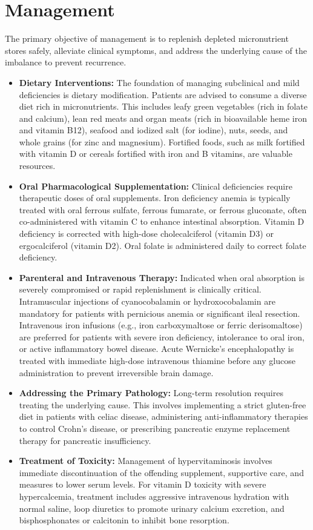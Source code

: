 \section*{Management}
The primary objective of management is to replenish depleted micronutrient stores safely, alleviate clinical symptoms, and address the underlying cause of the imbalance to prevent recurrence.

\begin{itemize}
    \item \textbf{Dietary Interventions:} The foundation of managing subclinical and mild deficiencies is dietary modification. Patients are advised to consume a diverse diet rich in micronutrients. This includes leafy green vegetables (rich in folate and calcium), lean red meats and organ meats (rich in bioavailable heme iron and vitamin B12), seafood and iodized salt (for iodine), nuts, seeds, and whole grains (for zinc and magnesium). Fortified foods, such as milk fortified with vitamin D or cereals fortified with iron and B vitamins, are valuable resources.
    \item \textbf{Oral Pharmacological Supplementation:} Clinical deficiencies require therapeutic doses of oral supplements. Iron deficiency anemia is typically treated with oral ferrous sulfate, ferrous fumarate, or ferrous gluconate, often co-administered with vitamin C to enhance intestinal absorption. Vitamin D deficiency is corrected with high-dose cholecalciferol (vitamin D3) or ergocalciferol (vitamin D2). Oral folate is administered daily to correct folate deficiency.
    \item \textbf{Parenteral and Intravenous Therapy:} Indicated when oral absorption is severely compromised or rapid replenishment is clinically critical. Intramuscular injections of cyanocobalamin or hydroxocobalamin are mandatory for patients with pernicious anemia or significant ileal resection. Intravenous iron infusions (e.g., iron carboxymaltose or ferric derisomaltose) are preferred for patients with severe iron deficiency, intolerance to oral iron, or active inflammatory bowel disease. Acute Wernicke's encephalopathy is treated with immediate high-dose intravenous thiamine before any glucose administration to prevent irreversible brain damage.
    \item \textbf{Addressing the Primary Pathology:} Long-term resolution requires treating the underlying cause. This involves implementing a strict gluten-free diet in patients with celiac disease, administering anti-inflammatory therapies to control Crohn's disease, or prescribing pancreatic enzyme replacement therapy for pancreatic insufficiency.
    \item \textbf{Treatment of Toxicity:} Management of hypervitaminosis involves immediate discontinuation of the offending supplement, supportive care, and measures to lower serum levels. For vitamin D toxicity with severe hypercalcemia, treatment includes aggressive intravenous hydration with normal saline, loop diuretics to promote urinary calcium excretion, and bisphosphonates or calcitonin to inhibit bone resorption.
\end{itemize}

